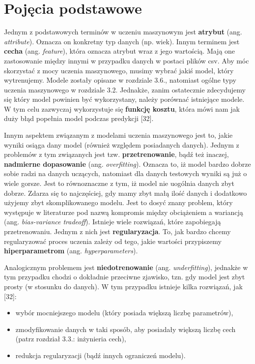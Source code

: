 \section{Pojęcia podstawowe}
\label{cha:cha3.1}

Jednym z podstawowych terminów w uczeniu maszynowym jest \textbf{atrybut} (ang. \textit{attribute}). Oznacza on konkretny typ danych (np. wiek). Innym terminem jest \textbf{cecha} (ang. \textit{feature}), która oznacza atrybut wraz z jego wartością. Mają one zastosowanie między innymi w przypadku danych w postaci plików csv. Aby móc skorzystać z mocy uczenia maszynowego, musimy wybrać jakiś model, który wytrenujemy. Modele zostały opisane w rozdziale 3.6., natomiast ogólne typy uczenia maszynowego w rozdziale 3.2. Jednakże, zanim ostatecznie zdecydujemy się który model powinien być wykorzystany, należy porównać istniejące modele. W tym celu zazwyczaj wykorzystuje się \textbf{funkcję kosztu}, która mówi nam jak duży błąd popełnia model podczas predykcji [32]. 

Innym aspektem związanym z modelami uczenia maszynowego jest to, jakie wyniki osiąga dany model (również względem posiadanych danych). Jednym z problemów z tym związanych jest tzw. \textbf{przetrenowanie}, bądź też inaczej, \textbf{nadmierne dopasowanie} (ang. \textit{overfitting}). Oznacza to, iż model bardzo dobrze sobie radzi na danych uczących, natomiast dla danych testowych wyniki są już o wiele gorsze. Jest to równoznaczne z tym, iż model nie uogólnia danych zbyt dobrze. Zdarza się to najczęściej, gdy mamy zbyt małą ilość danych i dodatkowo użyjemy zbyt skomplikowanego modelu. Jest to dosyć znany problem, który występuje w literaturze pod nazwą kompromis między obciążeniem a wariancją (ang. \textit{bias-variance tradeoff}). Istnieje wiele rozwiązań, które zapobiegają przetrenowaniu. Jednym z nich jest \textbf{regularyzacja}. To, jak bardzo chcemy regularyzować proces uczenia zależy od tego, jakie wartości przypiszemy \textbf{hiperparametrom} (ang. \textit{hyperparameters}). 

Analogicznym problemem jest \textbf{niedotrenowanie} (ang. \textit{underfitting}), jednakże w tym przypadku chodzi o dokładnie przeciwne zjawisko, tzn. gdy model jest zbyt prosty (w stosunku do danych). W tym przypadku istnieje kilka rozwiązań, jak [32]:
\begin{itemize}
\item
wybór mocniejszego modelu (który posiada większą liczbę parametrów),
\item
zmodyfikowanie danych w taki sposób, aby posiadały większą liczbę cech (patrz rozdział 3.3.: inżynieria cech),
\item
redukcja regularyzacji (bądź innych ograniczeń modelu).
\end{itemize} 
  
